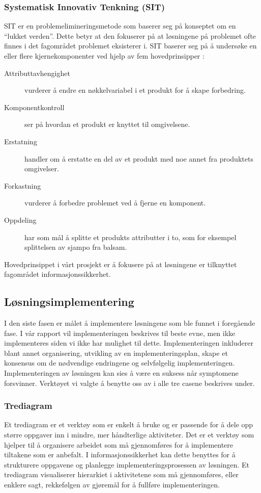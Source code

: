 \subsubsection{Systematisk Innovativ Tenkning (SIT)}
SIT er en problemelimineringsmetode som baserer seg på konseptet om en ``lukket verden''. Dette betyr at den fokuserer på at løsningene på problemet ofte finnes i det fagområdet problemet eksisterer i. SIT baserer seg på å undersøke en eller flere kjernekomponenter ved hjelp av fem hovedprinsipper \cite{RCA}: 

\begin{description}
    \item[Attributtavhengighet] vurderer å endre en nøkkelvariabel i et produkt for å skape forbedring.
    \item[Komponentkontroll] ser på hvordan et produkt er knyttet til omgivelsene.
    \item[Erstatning] handler om å erstatte en del av et produkt med noe annet fra produktets omgivelser.
    \item[Forkastning] vurderer å forbedre problemet ved å fjerne en komponent. 
    \item[Oppdeling] har som mål å splitte et produkts attributter i to, som for eksempel splittelsen av sjampo fra balsam.
\end{description}

Hovedprinsippet i vårt prosjekt er å fokusere på at løsningene er tilknyttet fagområdet informasjonssikkerhet.

\subsection{Løsningsimplementering}
I den siste fasen er målet å implementere løsningene som ble funnet i foregående fase. I vår rapport vil implementeringen beskrives til beste evne, men ikke implementeres siden vi ikke har mulighet til dette. Implementeringen inkluderer blant annet organisering, utvikling av en implementeringsplan, skape et konsensus om de nødvendige endringene og selvfølgelig implementeringen. Implementeringen av løsningen kan sies å være en suksess når symptomene forsvinner. Verktøyet vi valgte å benytte oss av i alle tre casene beskrives under. 

\subsubsection{Trediagram}
Et trediagram er et verktøy som er enkelt å bruke og er passende for å dele opp større oppgaver inn i mindre, mer håndterlige aktiviteter. Det er et verktøy som hjelper til å organisere arbeidet som må gjennomføres for å implementere tiltakene som er anbefalt. I informasjonssikkerhet kan dette benyttes for å strukturere oppgavene og planlegge implementeringsprosessen av løsningen. Et trediagram visualiserer hierarkiet i aktivitetene som må gjennomføres, eller enklere sagt, rekkefølgen av gjøremål for å fullføre implementeringen. 

